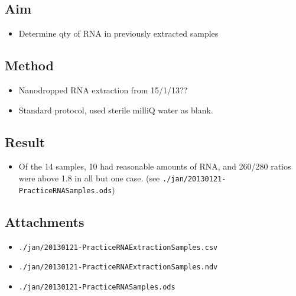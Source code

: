 \documentclass[12pt,a4paper]{book}
\begin{document}
    \subsection*{Aim}
      \begin{itemize} \itemsep1pt \parskip0pt 
        \item Determine qty of RNA in previously extracted samples
      \end{itemize}

    \subsection*{Method}
      \begin{itemize} \itemsep1pt \parskip0pt 
        \item Nanodropped RNA extraction from 15/1/13??
        \item Standard protocol, used sterile milliQ water as blank.
      \end{itemize}

    \subsection*{Result}
      \begin{itemize} \itemsep1pt \parskip0pt 
        \item Of the 14 samples, 10 had reasonable amounts of RNA, and 260/280 ratios were above 1.8 in all but one case.
        (see \verb+./jan/20130121-PracticeRNASamples.ods+)
      \end{itemize}

    \subsection*{Attachments}
      \begin{itemize} \itemsep1pt \parskip0pt 
        \item \verb+./jan/20130121-PracticeRNAExtractionSamples.csv+
        \item \verb+./jan/20130121-PracticeRNAExtractionSamples.ndv+
        \item \verb+./jan/20130121-PracticeRNASamples.ods+
      \end{itemize}
\end{document}

